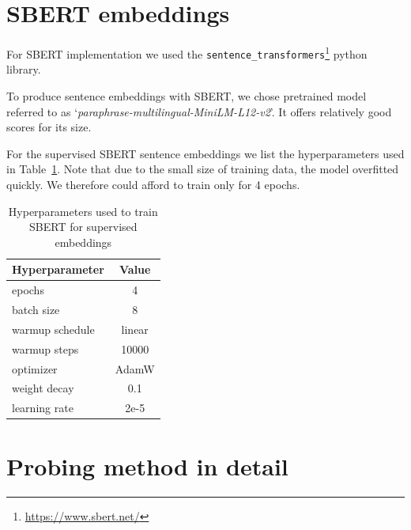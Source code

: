 \documentclass[11pt]{article}
\begin{document}






\clearpage
\appendix
\section{SBERT embeddings}\label{appendix:sbert_embeddings}

For SBERT implementation we used the
\texttt{sentence\_transformers}\footnote{\url{https://www.sbert.net/}} python
library.

To produce sentence embeddings with SBERT, we chose pretrained model referred
to as `\textit{paraphrase-multilingual-MiniLM-L12-v2}'. It offers relatively
good scores for its size.

For the supervised SBERT sentence embeddings we list the hyperparameters used
in Table~\ref{tab:sbert_supervised_hparams}. Note that due to the small size of
training data, the model overfitted quickly. We therefore could afford to train
only for 4 epochs.

\begin{table}[htp]
  \centering
  \begin{tabular}{l c}
    \toprule
    Hyperparameter & Value\\
    \midrule
    epochs & 4 \\
    batch size & 8 \\
    warmup schedule & linear \\
    warmup steps & 10000 \\
    optimizer & AdamW \\
    weight decay & 0.1 \\
    learning rate & 2e-5 \\
    \bottomrule
  \end{tabular}

  \caption{Hyperparameters used to train SBERT for supervised
  embeddings}\label{tab:sbert_supervised_hparams}

\end{table}

\section{Probing method in detail}\label{appendix:probing_method}
\end{document}
